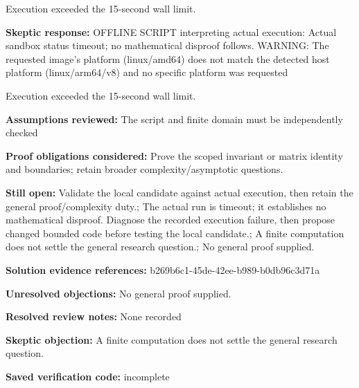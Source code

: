 \documentclass[11pt]{article}
\begin{document}
Execution exceeded the 15-second wall limit.\par
\textbf{Skeptic response:} OFFLINE SCRIPT interpreting actual execution: Actual sandbox status timeout; no mathematical disproof follows. WARNING: The requested image's platform (linux/amd64) does not match the detected host platform (linux/arm64/v8) and no specific platform was requested

Execution exceeded the 15-second wall limit.\par
\textbf{Assumptions reviewed:} The script and finite domain must be independently checked\par
\textbf{Proof obligations considered:} Prove the scoped invariant or matrix identity and boundaries; retain broader complexity/asymptotic questions.\par
\textbf{Still open:} Validate the local candidate against actual execution, then retain the general proof/complexity duty.; The actual run is timeout; it establishes no mathematical disproof. Diagnose the recorded execution failure, then propose changed bounded code before testing the local candidate.; A finite computation does not settle the general research question.; No general proof supplied.\par
\textbf{Solution evidence references:} b269b6c1-45de-42ee-b989-b0db96c3d71a\par
\textbf{Unresolved objections:} No general proof supplied.\par
\textbf{Resolved review notes:} None recorded\par
\textbf{Skeptic objection:} A finite computation does not settle the general research question.\par
\textbf{Saved verification code:} incomplete\par
\end{document}
